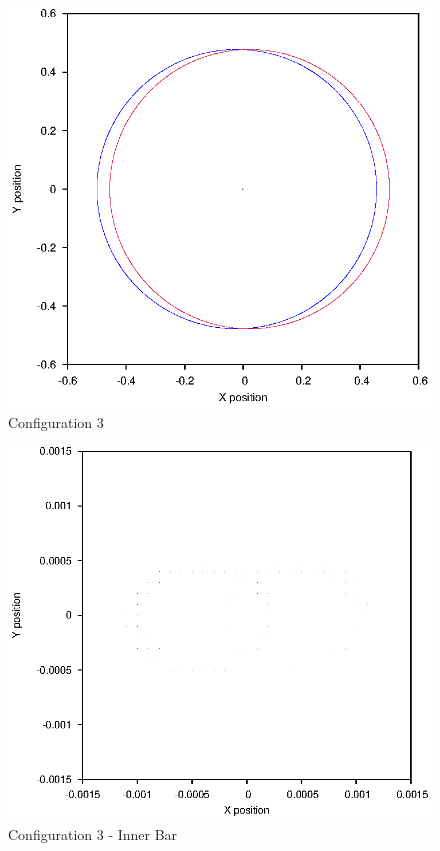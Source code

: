 \documentclass[a4paper,12pt]{article}
\begin{document}
\begin{figure}[H]
\centering
\includegraphics[width=.9\textwidth]{./results/003-5-001/Orbit.eps}
\caption{Configuration 3}
\label{fig:config3}
\end{figure}
\begin{figure}[H]
\centering
\includegraphics[width=.9\textwidth]{./results/003-5-001/Inner.eps}
\caption{Configuration 3 - Inner Bar}
\label{fig:config3i}
\end{figure}
\end{document}
